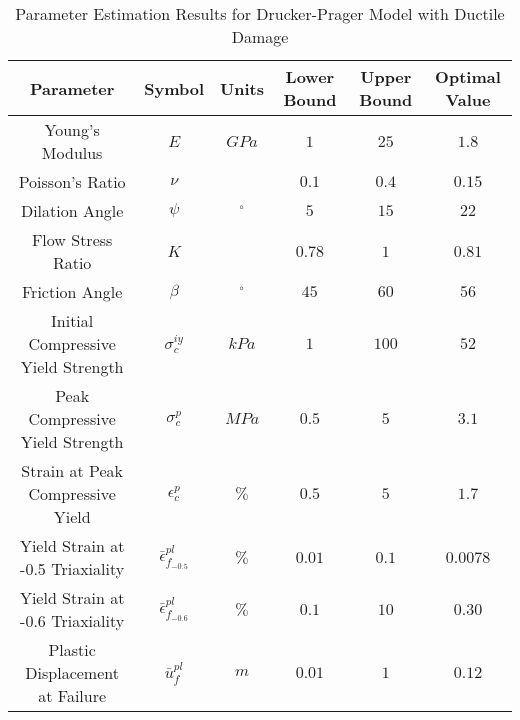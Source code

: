 \begin{table}[!htbp]
\centering
\caption{Parameter Estimation Results for Drucker-Prager Model with Ductile Damage}
\label{tab:paramDrucker}
\begin{tabular}{@{}cccccc@{}}
\toprule
Parameter                                  & Symbol                            & Units      & Lower Bound & Upper Bound & Optimal Value \\ \midrule
Young's Modulus                            & $E$                               & $GPa$      & $1$         & $25$        & $1.8$        \\
Poisson's Ratio                            & $\nu$                             &            & $0.1$      & $0.4$      & $0.15$        \\
Dilation Angle                             & $\psi$                            & $^{\circ}$ & $5$         & $15$        & $22$        \\
Flow Stress Ratio                          & $K$                               &            & $0.78$      & $1$         & $0.81$        \\
Friction Angle                             & $\beta$                           & $^{\circ}$ & $45$        & $60$        & $56$        \\
Initial Compressive Yield Strength         & $\sigma_c^{iy}$                   & $kPa$      & $1$         & $100$       & $52$        \\
Peak Compressive Yield Strength             & $\sigma_c^{p}$                    & $MPa$      & $0.5$       & $5$         & $3.1$        \\
Strain at Peak Compressive Yield           & $\epsilon_c^{p}$                 & $\%$       & $0.5$       & $5$         & $1.7$        \\
Yield Strain at -0.5 Triaxiality           & $\bar{\epsilon}^{pl}_{f_{-0.5}}$  & $\%$       & $0.01$      & $0.1$       & $0.0078$       \\
Yield Strain at -0.6 Triaxiality          & $\bar{\epsilon}^{pl}_{f_{-0.6}}$ & $\%$       & $0.1$       & $10$        & $0.30$        \\
Plastic Displacement at Failure            & $\bar{u}^{pl}_f$                  & $m$        & $0.01$      & $1$         & $0.12$      \\ \bottomrule
\end{tabular}
\end{table}

